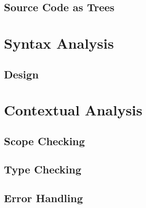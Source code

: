 \section{Source Code as Trees}


\chapter{Syntax Analysis}
\section{Design}









\chapter{Contextual Analysis}



\section{Scope Checking}


\section{Type Checking}


\section{Error Handling}




